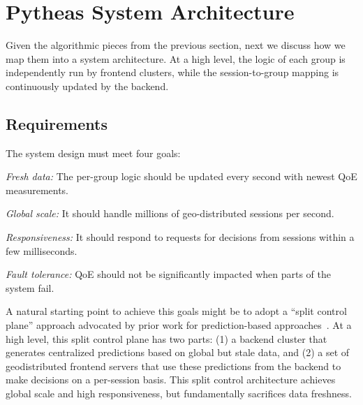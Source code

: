 \section{Pytheas System Architecture}
\label{sec:pytheas:system}

Given the algorithmic pieces from the previous section, next 
we discuss how we map them into a system architecture.
  At  a high level, the \mab logic of each group is independently run by frontend clusters,
while the session-to-group mapping is continuously updated by the 
backend.


\subsection{Requirements} 
 The \name system design must meet four goals:
\begin{packedenumerate}
\item {\em Fresh data:} The per-group \mab logic should be updated every second with newest QoE measurements.
\item {\em Global scale:} It should handle millions of geo-distributed sessions per second.
\item {\em Responsiveness:} It should respond to requests for decisions from sessions within
 a few  milliseconds.
\item {\em Fault tolerance:} QoE should not be significantly impacted when parts of the system fail.
\end{packedenumerate}




A natural starting point to achieve this goals might be to adopt a ``split
control plane'' approach advocated by prior work for prediction-based 
approaches~\cite{c3,cfa}.  At a high level, this split control plane has two parts: (1)
a backend cluster that generates centralized predictions  based on  global but
stale data, and (2) a set of geodistributed frontend servers  that use these predictions
from the backend to make decisions on a per-session basis.  
This split control architecture  achieves  global  scale and
high responsiveness, but fundamentally sacrifices data freshness.  


